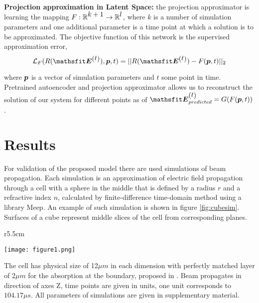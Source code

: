 \documentclass{article} %
\begin{document}
\textbf{\\Projection approximation in Latent Space:} the projection approximator is learning the mapping \mbox{$\displaystyle F:\displaystyle \mathbb{R}^{\displaystyle k+1} \rightarrow \displaystyle \mathbb{R}^{\displaystyle l}$}, where $\displaystyle k$ is a number of simulation parameters and one additional parameter is a time point at which a solution is to be approximated. The objective function of this network is the supervised approximation error,
\begin{equation*}
    \displaystyle \mathcal{L}_F(R(\displaystyle \tE^{\left (\displaystyle t\right )}), \displaystyle \vp, \displaystyle t) = \displaystyle ||R(\displaystyle \tE^{\left (\displaystyle t\right )})-F(\displaystyle \vp,\displaystyle t)||_2
\end{equation*}

where $\displaystyle {\bm{p}}$ is a vector of simulation parameters and $\displaystyle t$ some point in time. Pretrained autoencoder and projection approximator allows us to reconstruct the solution of our system for different points as of $\displaystyle \tE_{predicted}^{\left (\displaystyle t\right )}= \displaystyle G(\displaystyle F(\displaystyle \vp, \displaystyle t))$. 

\section{Results}

For validation of the proposed model there are used simulations of beam propagation. 
Each simulation is an approximation of electric field propagation through a cell with a sphere in the middle that is defined by a radius $\displaystyle r$ and a refractive index $\displaystyle n$, calculated by finite-difference time-domain method\citep{ftdt} using a library Meep\citep{meep}. An example of such simulation is shown in figure \ref{fig:cubesim}. Surfaces of a cube represent middle slices of the cell from corresponding planes. 

\begin{wrapfigure}[15]{r}{5.5cm}
    \begin{center}
    \vspace*{-7mm}
    \texttt{[image: figure1.png]}
    \caption{Example of simulation}
    \label{fig:cubesim}
    \end{center}
\end{wrapfigure} 
The cell has physical size of 12$\displaystyle \mu m$ in each dimension with perfectly matched layer of 2$\displaystyle \mu m$ for the absorption at the boundary, proposed in \citep{pml}. Beam propagates in direction of axes Z, time points are given in units, one unit corresponds to $104.17 \mu s$. All parameters of simulations are given in supplementary material.
\end{document}
